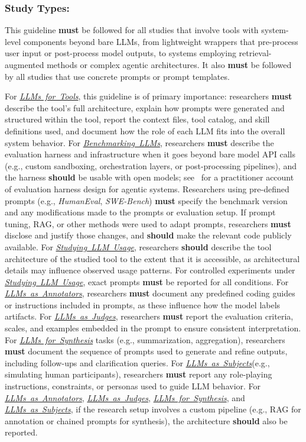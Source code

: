 \documentclass[smallextended]{svjour3}
\newcommand{\must}{\textbf{must}\xspace}
\newcommand{\should}{\textbf{should}\xspace}
\newcommand{\annotators}{\hyperref[sec:llms-as-annotators]{\mbox{\emph{LLMs as Annotators}}}\xspace}
\newcommand{\judges}{\hyperref[sec:llms-as-judges]{\mbox{\emph{LLMs as Judges}}}\xspace}
\newcommand{\synthesis}{\hyperref[sec:llms-for-synthesis]{\mbox{\emph{LLMs for Synthesis}}}\xspace}
\newcommand{\subjects}{\hyperref[sec:llms-as-subjects]{\mbox{\emph{LLMs as Subjects}}}\xspace}
\newcommand{\llmusage}{\hyperref[sec:studying-llm-usage-in-software-engineering]{\mbox{\emph{Studying LLM Usage}}}\xspace}
\newcommand{\newtools}{\hyperref[sec:llms-for-new-software-engineering-tools]{\mbox{\emph{LLMs for Tools}}}\xspace}
\newcommand{\benchmarkingtasks}{\hyperref[sec:benchmarking-llms-for-software-engineering-tasks]{\mbox{\emph{Benchmarking LLMs}}}\xspace}
\newcommand{\annotators}{\href{/study-types/annotators/}{\emph{LLMs as Annotators}}\xspace}
\newcommand{\judges}{\href{/study-types/judges/}{\emph{LLMs as Judges}}\xspace}
\newcommand{\synthesis}{\href{/study-types/synthesis/}{\emph{LLMs for Synthesis}}\xspace}
\newcommand{\subjects}{\href{/study-types/subjects/}{\emph{LLMs as Subjects}}\xspace}
\newcommand{\llmusage}{\href{/study-types/usage/}{\emph{Studying LLM Usage}}\xspace}
\newcommand{\newtools}{\href{/study-types/tools/}{\emph{LLMs for Tools}}\xspace}
\newcommand{\benchmarkingtasks}{\href{/study-types/benchmarking/}{\emph{Benchmarking LLMs}}\xspace}
\newcommand{\guidelinesubsubsection}[1]{\subsubsection{\bfseries #1:}}
\newcommand{\guidelinesubsubsection}[1]{\subsubsection{#1}}
\begin{document}
\guidelinesubsubsection{Study Types}

This guideline \must be followed for all studies that involve tools with system-level components beyond bare LLMs, from lightweight wrappers that pre-process user input or post-process model outputs, to systems employing retrieval-augmented methods or complex agentic architectures.
It also \must be followed by all studies that use concrete prompts or prompt templates.

For \newtools, this guideline is of primary importance: researchers \must describe the tool's full architecture, explain how prompts were generated and structured within the tool, report the context files, tool catalog, and skill definitions used, and document how the role of each LLM fits into the overall system behavior.
For \benchmarkingtasks, researchers \must describe the evaluation harness and infrastructure when it goes beyond bare model API calls (e.g., custom sandboxing, orchestration layers, or post-processing pipelines), and the harness \should be usable with open models; see~\cite{Anthropic2025evals} for a practitioner account of evaluation harness design for agentic systems.
Researchers using pre-defined prompts (e.g., \emph{HumanEval}, \emph{SWE-Bench}) \must specify the benchmark version and any modifications made to the prompts or evaluation setup.
If prompt tuning, RAG, or other methods were used to adapt prompts, researchers \must disclose and justify those changes, and \should make the relevant code publicly available.
For \llmusage, researchers \should describe the tool architecture of the studied tool to the extent that it is accessible, as architectural details may influence observed usage patterns.
For controlled experiments under \llmusage, exact prompts \must be reported for all conditions.
For \annotators, researchers \must document any predefined coding guides or instructions included in prompts, as these influence how the model labels artifacts.
For \judges, researchers \must report the evaluation criteria, scales, and examples embedded in the prompt to ensure consistent interpretation.
For \synthesis tasks (e.g., summarization, aggregation), researchers \must document the sequence of prompts used to generate and refine outputs, including follow-ups and clarification queries.
For \subjects (e.g., simulating human participants), researchers \must report any role-playing instructions, constraints, or personas used to guide LLM behavior.
For \annotators, \judges, \synthesis, and \subjects, if the research setup involves a custom pipeline (e.g., RAG for annotation or chained prompts for synthesis), the architecture \should also be reported.
\end{document}
